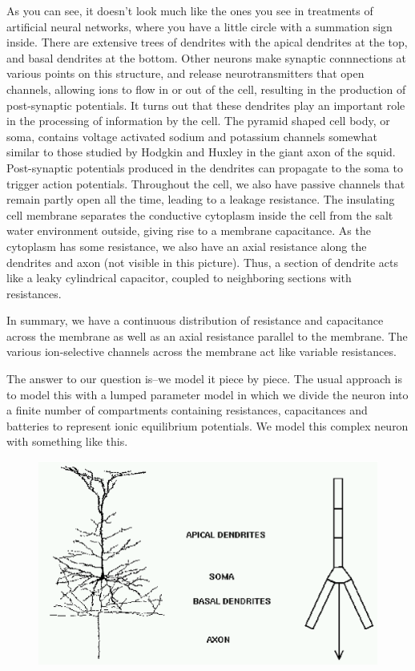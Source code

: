 \documentclass[12pt]{article}
\begin{document}
As you can see, it doesn't look much like the ones you see in treatments of artificial neural networks, where you have a little circle with a summation sign inside. There are extensive trees of dendrites with the apical dendrites at the top, and basal dendrites at the bottom. Other neurons make synaptic connnections at various points on this structure, and release neurotransmitters that open channels, allowing ions to flow in or out of the cell, resulting in the production of post-synaptic potentials. It turns out that these dendrites play an important role in the processing of information by the cell. The pyramid shaped cell body, or soma, contains voltage activated sodium and potassium channels somewhat similar to those studied by Hodgkin and Huxley in the giant axon of the squid. Post-synaptic potentials produced in the dendrites can propagate to the soma to trigger action potentials. Throughout the cell, we also have passive channels that remain partly open all the time, leading to a leakage resistance. The insulating cell membrane separates the conductive cytoplasm inside the cell from the salt water environment outside, giving rise to a membrane capacitance. As the cytoplasm has some resistance, we also have an axial resistance along the dendrites and axon (not visible in this picture). Thus, a section of dendrite acts like a leaky cylindrical capacitor, coupled to neighboring sections with resistances.

In summary, we have a continuous distribution of resistance and capacitance across the membrane as well as an axial resistance parallel to the membrane. The various ion-selective channels across the membrane act like variable resistances.

The answer to our question is--we model it piece by piece. The usual approach is to model this with a lumped parameter model in which we divide the neuron into a finite number of compartments containing resistances, capacitances and batteries to represent ionic equilibrium potentials. We model this complex neuron with something like this.

\begin{figure}[h]
  \centering
 \includegraphics[scale=0.5]{figs/compartments.eps}
  \label{fig:compartments}
\end{figure}
\end{document}
